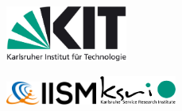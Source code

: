 \begin{titlepage}

	
	
\begin{figure}[htbp]
  
  \begin{minipage}[b]{.4\textwidth}
    \includegraphics[width=4cm]{0_Logos/kit.jpg}  
  \end{minipage}%
  \hfill
  \begin{minipage}[b]{.6\textwidth}
	\begin{flushright}
	    \includegraphics[width=3cm]{0_Logos/IISM_logo.png}
	    \hspace{0.3cm}
        \includegraphics[width=2.5cm]{0_Logos/KSRI_logo.png}  
	\end{flushright}
  \end{minipage}
  
\end{figure}


\end{titlepage}
